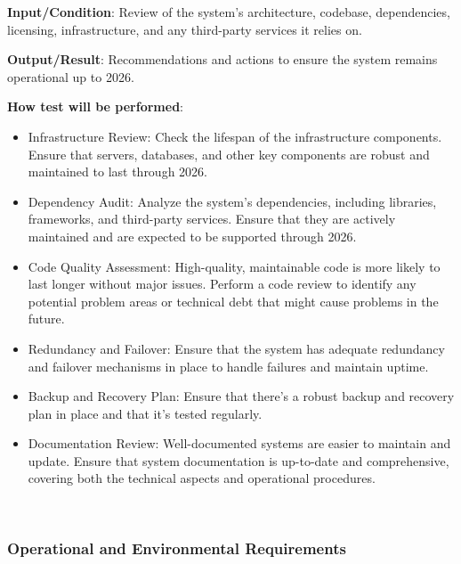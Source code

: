 \documentclass[12pt, titlepage]{article}
\begin{document}
\begin{enumerate}
\textbf{Input/Condition}: Review of the system's architecture, codebase, dependencies, licensing, infrastructure, and any third-party services it relies on.

\textbf{Output/Result}: Recommendations and actions to ensure the system remains operational up to 2026.

\textbf{How test will be performed}: 
\begin{itemize}
    \item Infrastructure Review: Check the lifespan of the infrastructure components. Ensure that servers, databases, and other key components are robust and maintained to last through 2026.
    \item Dependency Audit: Analyze the system's dependencies, including libraries, frameworks, and third-party services. Ensure that they are actively maintained and are expected to be supported through 2026.
    \item Code Quality Assessment: High-quality, maintainable code is more likely to last longer without major issues. Perform a code review to identify any potential problem areas or technical debt that might cause problems in the future.
    \item Redundancy and Failover: Ensure that the system has adequate redundancy and failover mechanisms in place to handle failures and maintain uptime.
    \item Backup and Recovery Plan: Ensure that there's a robust backup and recovery plan in place and that it's tested regularly.
    \item Documentation Review: Well-documented systems are easier to maintain and update. Ensure that system documentation is up-to-date and comprehensive, covering both the technical aspects and operational procedures.
\end{itemize}\\

\end{enumerate}


\subsubsection{Operational and Environmental Requirements}
\end{document}
